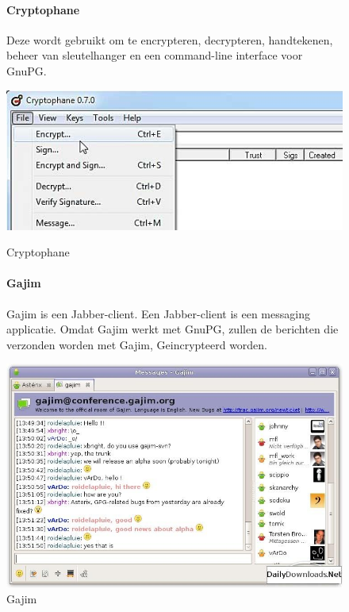 \documentclass[12pt]{article}
\begin{document}
				\begin{figure}[!ht]
					\paragraph{Cryptophane}
						Deze wordt gebruikt om te encrypteren, decrypteren, handtekenen, beheer van 							sleutelhanger en een command-line interface voor GnuPG.\\
					\begin{center}
						\includegraphics[scale=0.6]{Pictures/cryptophane}
					\end{center}
					\caption{Cryptophane}
				
					\paragraph{Gajim}
						Gajim is een Jabber-client. Een Jabber-client is een messaging applicatie.
						Omdat Gajim werkt met GnuPG, zullen de berichten die verzonden worden met 								Gajim, Geincrypteerd worden.
					\begin{center}
						\includegraphics[scale=0.4]{Pictures/gajim}
					\end{center}
					\caption{Gajim}
				\end{figure}
				
\end{document}
